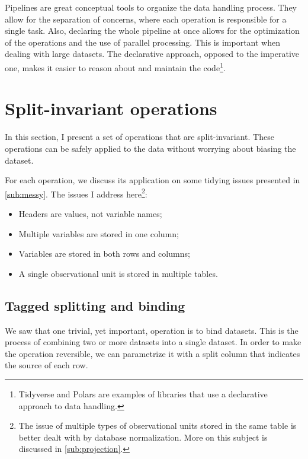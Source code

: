 Pipelines are great conceptual tools to organize the data handling process.  They allow
for the separation of concerns, where each operation is responsible for a single task.
Also, declaring the whole pipeline at once allows for the optimization of the operations
and the use of parallel processing.  This is important when dealing with large datasets.
The declarative approach, opposed to the imperative one, makes it easier to reason about
and maintain the code\footnote{Tidyverse and Polars are examples of
libraries that use a declarative approach to data handling.}.

\section{Split-invariant operations}
\label{sec:split-invariant-ops}

In this section, I present a set of operations that are split-invariant.  These operations
can be safely applied to the data without worrying about biasing the dataset.

For each operation, we discuss its application on some tidying issues presented in
\cref{sub:messy}.  The issues I address here\footnote{%
The issue of multiple types of observational units stored in the same table is better
dealt with by database normalization.  More on this subject is discussed in
\cref{sub:projection}.}:
\begin{itemize}
  \itemsep0em
  \item Headers are values, not variable names;
  \item Multiple variables are stored in one column; %
  \item Variables are stored in both rows and columns;
  \item A single observational unit is stored in multiple tables.
\end{itemize}



\subsection{Tagged splitting and binding}

We saw that one trivial, yet important, operation is to bind datasets.  This is the
process of combining two or more datasets into a single dataset.  In order to make the
operation reversible, we can parametrize it with a split column that indicates the source
of each row.

